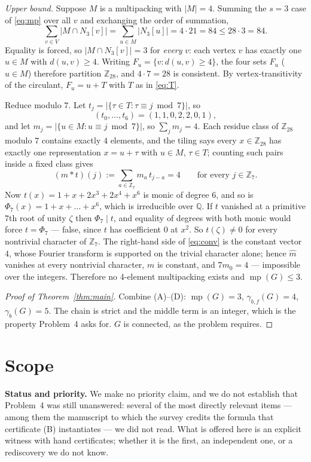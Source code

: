 \documentclass[11pt]{amsart}
\theoremstyle{remark}
\newcommand{\mult}{\operatorname{mp}}
\newcommand{\gb}{\gamma_b}
\newcommand{\gbf}{\gamma_{b,f}}
\newcommand{\Zn}[1]{\mathbb Z_{#1}}
\begin{document}
\emph{Upper bound.} Suppose $M$ is a multipacking with $|M|=4$. Summing the $s=3$ case of
\eqref{eq:mp} over all $v$ and exchanging the order of summation,
\[
 \sum_{v\in V}|M\cap N_3[v]|=\sum_{u\in M}|N_3[u]|=4\cdot 21=84
 \le 28\cdot 3=84 .
\]
Equality is forced, so $|M\cap N_3[v]|=3$ for \emph{every} $v$: each vertex $v$ has exactly
one $u\in M$ with $d(u,v)\ge4$. Writing $F_u=\{v:d(u,v)\ge4\}$, the four sets $F_u$
($u\in M$) therefore partition $\Zn{28}$, and $4\cdot 7=28$ is consistent. By
vertex-transitivity of the circulant, $F_u=u+T$ with $T$ as in \eqref{eq:T}.

Reduce modulo $7$. Let $t_j=|\{\tau\in T:\tau\equiv j\bmod 7\}|$, so
\[
 (t_0,\dots,t_6)=(1,1,0,2,2,0,1),
\]
and let $m_j=|\{u\in M: u\equiv j\bmod 7\}|$, so $\sum_j m_j=4$. Each residue class of
$\Zn{28}$ modulo $7$ contains exactly $4$ elements, and the tiling says every $x\in\Zn{28}$
has exactly one representation $x=u+\tau$ with $u\in M$, $\tau\in T$; counting such pairs
inside a fixed class gives
\begin{equation}\label{eq:conv}
 (m*t)(j):=\sum_{a\in\Zn7} m_a\,t_{j-a}=4
 \qquad\text{for every } j\in\Zn 7 .
\end{equation}
Now $t(x)=1+x+2x^3+2x^4+x^6$ is monic of degree $6$, and so is
$\Phi_7(x)=1+x+\dots+x^6$, which is irreducible over $\mathbb Q$. If $t$ vanished at a
primitive $7$th root of unity $\zeta$ then $\Phi_7\mid t$, and equality of degrees with
both monic would force $t=\Phi_7$ --- false, since $t$ has coefficient $0$ at $x^2$. So
$t(\zeta)\ne0$ for every nontrivial character of $\Zn7$. The right-hand side of
\eqref{eq:conv} is the constant vector $4$, whose Fourier transform is supported on the
trivial character alone; hence $\widehat m$ vanishes at every nontrivial character, $m$ is
constant, and $7m_0=4$ --- impossible over the integers. Therefore no $4$-element
multipacking exists and $\mult(G)\le3$.

\begin{proof}[Proof of Theorem~\ref{thm:main}]
Combine (A)--(D): $\mult(G)=3$, $\gbf(G)=4$, $\gb(G)=5$. The chain is strict and the middle
term is an integer, which is the property Problem~4 asks for. $G$ is connected,
as the problem requires.
\end{proof}

\section{Scope}

\noindent\textbf{Status and priority.} We make no priority claim, and we do not establish
that Problem~4 was still unanswered: several of the most directly relevant items --- among
them the manuscript \cite{BD} to which the survey credits the formula that certificate (B)
instantiates --- we did not read. What is offered here is an explicit witness with hand
certificates; whether it is the first, an independent one, or a rediscovery we do not know.
\end{document}
